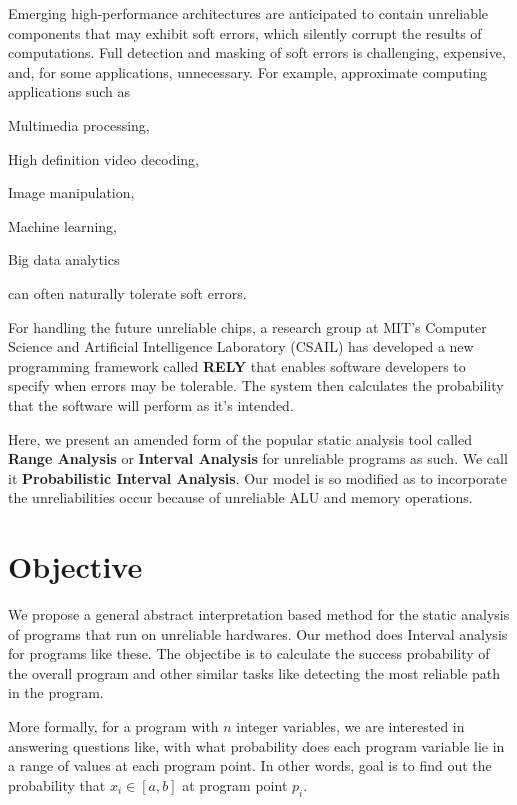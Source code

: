 \documentclass[final,3p, review, times]{Elsevier/elsarticle}
\begin{document}
Emerging high-performance architectures are anticipated to contain unreliable components that may exhibit soft errors, which silently corrupt the results of computations. Full detection and masking of soft errors is challenging, expensive, and, for some applications, unnecessary. For example, approximate computing applications such as
\begin{inparaenum}
  \item Multimedia processing,
  \item High definition video decoding,
  \item Image manipulation,
  \item Machine learning,
  \item Big data analytics
\end{inparaenum}
can often naturally tolerate soft errors.

For handling the future unreliable chips, a research group at MIT's Computer Science and Artificial Intelligence Laboratory (CSAIL) has developed a new programming framework called \textbf{RELY}\cite{carbin13} that enables software developers to specify when errors may be tolerable. The system then calculates the probability that the software will perform as it's intended.

Here, we present an amended form of the popular static analysis tool called \textbf{Range Analysis} or \textbf{Interval Analysis} for unreliable programs as such. We call it \textbf{Probabilistic Interval Analysis}. Our model is so modified as to incorporate the unreliabilities occur because of unreliable ALU and memory operations.

\section{Objective}

We propose a general abstract interpretation based method for the static analysis of programs that run on unreliable hardwares. Our method does Interval analysis for programs like these. The objectibe is to calculate the success probability of the overall program and other similar tasks like detecting the most reliable path in the program.

More formally, for a program with $n$ integer variables, we are interested in answering questions like, with what probability does each program variable lie in a range of values at each program point. In other words, goal is to find out the probability that $x_i\in[a,b]$ at program point $p_i$.
\end{document}
